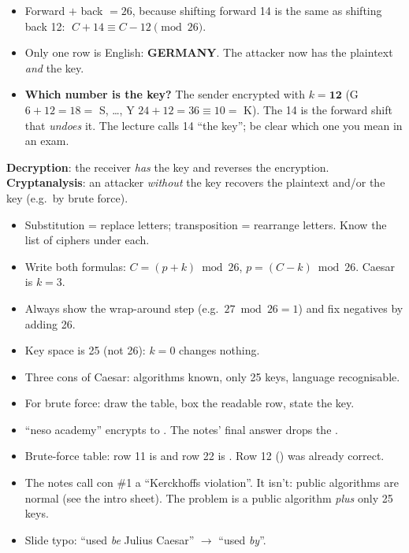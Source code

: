 \begin{itemize}
  \item Forward $+$ back $= 26$, because shifting forward 14 is the same as shifting back 12: $\;C + 14 \equiv C - 12 \pmod{26}$.
  \item Only one row is English: \textbf{GERMANY}. The attacker now has the plaintext \emph{and} the key.
  \item \textbf{Which number is the key?} The sender encrypted with $k = \mathbf{12}$ (G $6+12=18=$ S, \dots, Y $24+12=36\equiv10=$ K). The 14 is the forward shift that \emph{undoes} it. The lecture calls 14 ``the key''; be clear which one you mean in an exam.
\end{itemize}

\begin{keybox}[title=Decryption vs.\ cryptanalysis]
\textbf{Decryption}: the receiver \emph{has} the key and reverses the encryption.\\
\textbf{Cryptanalysis}: an attacker \emph{without} the key recovers the plaintext and/or the key (e.g.\ by brute force).
\end{keybox}

\begin{examtip}
\begin{itemize}
  \item Substitution = replace letters; transposition = rearrange letters. Know the list of ciphers under each.
  \item Write both formulas: $C=(p+k)\bmod 26$, $p=(C-k)\bmod 26$. Caesar is $k=3$.
  \item Always show the wrap-around step (e.g.\ $27 \bmod 26 = 1$) and fix negatives by adding 26.
  \item Key space is 25 (not 26): $k=0$ changes nothing.
  \item Three cons of Caesar: algorithms known, only 25 keys, language recognisable.
  \item For brute force: draw the table, box the readable row, state the key.
\end{itemize}
\end{examtip}

\begin{fixbox}
\begin{itemize}
  \item ``neso academy'' encrypts to . The notes' final answer  drops the .
  \item Brute-force table: row 11 is  and row 22 is . Row 12 () was already correct.
  \item The notes call con \#1 a ``Kerckhoffs violation''. It isn't: public algorithms are normal (see the intro sheet). The problem is a public algorithm \emph{plus} only 25 keys.
  \item Slide typo: ``used \emph{be} Julius Caesar'' $\to$ ``used \emph{by}''.
\end{itemize}
\end{fixbox}
